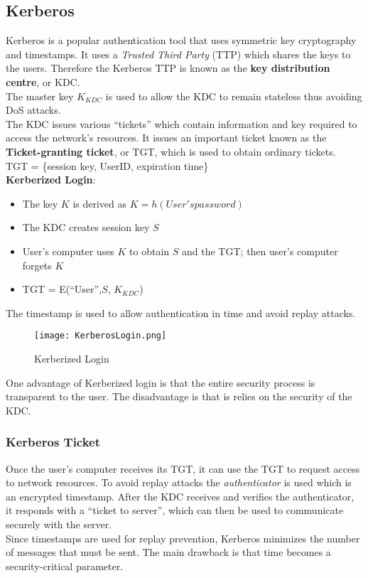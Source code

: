 \documentclass[a4paper]{article}
\begin{document}
\subsection{Kerberos}
Kerberos is a popular authentication tool that uses symmetric key cryptography and timestamps. It uses a \textit{Trusted Third Party} (TTP) which shares the keys to the users. Therefore the Kerberos TTP is known as the \textbf{key distribution centre}, or KDC.\\
The master key $K_{KDC}$ is used to allow the KDC to remain stateless thus avoiding DoS attacks.\\
The KDC issues various ``tickets'' which contain information and key required to access the network's resources. It issues an important ticket known as the \textbf{Ticket-granting ticket}, or TGT, which is used to obtain ordinary tickets.\\
TGT = \{session key, UserID, expiration time\}\\
\textbf{Kerberized Login}:
\begin{itemize}
    \item The key $K$ is derived as $K = h(User's password)$
    \item The KDC creates session key $S$
    \item User's computer uses $K$ to obtain $S$ and the TGT; then user's computer forgets $K$
    \item TGT = E(``User'',$S$, $K_{KDC}$)
\end{itemize}{}
The timestamp is used to allow authentication in time and avoid replay attacks.
\begin{figure}[H]
    \centering
    \texttt{[image: KerberosLogin.png]}
    \caption{Kerberized Login}
\end{figure}
One advantage of Kerberized login is that the entire security process is transparent to the user. The disadvantage is that is relies on the security of the KDC.

\subsubsection{Kerberos Ticket}
Once the user's computer receives its TGT, it can use the TGT to request access to network resources. To avoid replay attacks the \textit{authenticator} is used which is an encrypted timestamp. After the KDC receives and verifies the authenticator, it responds with a ``ticket to server'', which can then be used to communicate securely with the server.\\
Since timestamps are used for replay prevention, Kerberos minimizes the number of messages that must be sent. The main drawback is that time becomes a security-critical parameter.
\end{document}
